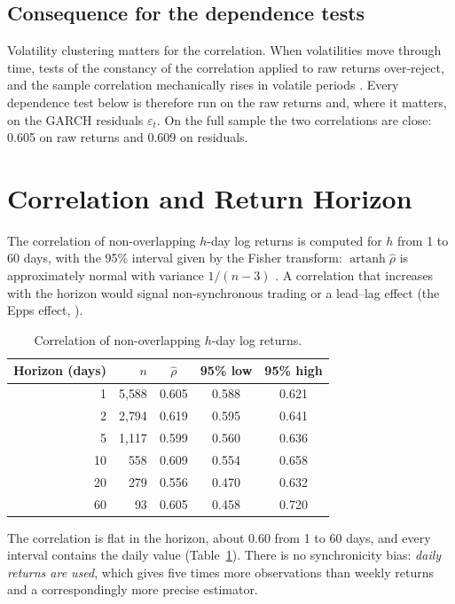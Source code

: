 \documentclass[11pt,a4paper]{article}
\DeclareMathOperator{\artanh}{artanh}
\begin{document}
\subsection{Consequence for the dependence tests}
Volatility clustering matters for the correlation. When volatilities move through time, tests of the constancy of the
correlation applied to raw returns over-reject, and the sample correlation mechanically rises in volatile periods
\cite{forbesrigobon2002}. Every dependence test below is therefore run on the raw returns and, where it matters, on
the GARCH residuals $\varepsilon_t$. On the full sample the two correlations are close: 0.605 on raw returns and
0.609 on residuals.

\section{Correlation and Return Horizon}\label{sec:horizon}
The correlation of non-overlapping $h$-day log returns is computed for $h$ from 1 to 60 days, with the 95\% interval
given by the Fisher transform: $\artanh\hat\rho$ is approximately normal with variance $1/(n-3)$ \cite{fisher1921}.
A correlation that increases with the horizon would signal non-synchronous trading or a lead--lag effect (the Epps
effect, \cite{epps1979}).

\begin{table}[h]
\centering
\begin{tabular}{@{}rrccc@{}}
\toprule
Horizon (days) & $n$ & $\hat\rho$ & 95\% low & 95\% high \\
\midrule
1  & 5{,}588 & 0.605 & 0.588 & 0.621 \\
2  & 2{,}794 & 0.619 & 0.595 & 0.641 \\
5  & 1{,}117 & 0.599 & 0.560 & 0.636 \\
10 & 558     & 0.609 & 0.554 & 0.658 \\
20 & 279     & 0.556 & 0.470 & 0.632 \\
60 & 93      & 0.605 & 0.458 & 0.720 \\
\bottomrule
\end{tabular}
\caption{Correlation of non-overlapping $h$-day log returns.}
\label{tab:horizon}
\end{table}

The correlation is flat in the horizon, about 0.60 from 1 to 60 days, and every interval contains the daily value
(Table~\ref{tab:horizon}). There is no synchronicity bias: \emph{daily returns are used}, which gives five times
more observations than weekly returns and a correspondingly more precise estimator.
\end{document}
